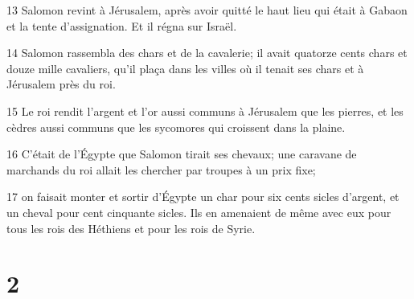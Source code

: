 \par 13 Salomon revint à Jérusalem, après avoir quitté le haut lieu qui était à Gabaon et la tente d'assignation. Et il régna sur Israël.
\par 14 Salomon rassembla des chars et de la cavalerie; il avait quatorze cents chars et douze mille cavaliers, qu'il plaça dans les villes où il tenait ses chars et à Jérusalem près du roi.
\par 15 Le roi rendit l'argent et l'or aussi communs à Jérusalem que les pierres, et les cèdres aussi communs que les sycomores qui croissent dans la plaine.
\par 16 C'était de l'Égypte que Salomon tirait ses chevaux; une caravane de marchands du roi allait les chercher par troupes à un prix fixe;
\par 17 on faisait monter et sortir d'Égypte un char pour six cents sicles d'argent, et un cheval pour cent cinquante sicles. Ils en amenaient de même avec eux pour tous les rois des Héthiens et pour les rois de Syrie.

\chapter{2}

